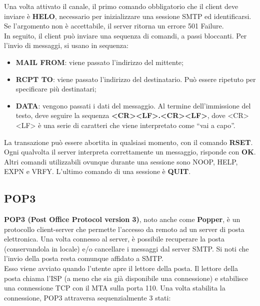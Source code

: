         Una volta attivato il canale, il primo comando obbligatorio che il client deve inviare è \textbf{HELO},
        necessario per inizializzare una sessione SMTP ed identificarsi. Se l’argomento non è
        accettabile, il server ritorna un errore 501 Failure.\\
        
        In seguito, il client può inviare una sequenza di comandi, a passi bloccanti. Per l’invio di
        messaggi, si usano in sequenza:

        \begin{itemize}
            \item \textbf{MAIL FROM}: viene passato l’indirizzo del mittente;
            \item \textbf{RCPT TO}: viene passato l’indirizzo del destinatario. Può essere ripetuto per specificare
            più destinatari;
            \item \textbf{DATA}: vengono passati i dati del messaggio. Al termine dell’immissione del testo, deve
            seguire la sequenza \textbf{<CR><LF>.<CR><LF>}, dove <CR><LF> è una serie di caratteri che
            viene interpretato come “vai a capo”.
        \end{itemize}
        
        La transazione può essere abortita in qualsiasi momento, con il comando \textbf{RSET}. Ogni qualvolta
        il server interpreta correttamente un messaggio, risponde con \textbf{OK}. Altri comandi utilizzabili
        ovunque durante una sessione sono NOOP, HELP, EXPN e VRFY. L’ultimo comando di una
        sessione è \textbf{QUIT}.
        
    \subsection{POP3}
        \textbf{POP3 (Post Office Protocol version 3)}, noto anche come \textbf{Popper}, è un protocollo client-server
        che permette l’accesso da remoto ad un server di posta elettronica. Una volta connesso al
        server, è possibile recuperare la posta (conservandola in locale) e/o cancellare i messaggi dal
        server SMTP. Si noti che l’invio della posta resta comunque affidato a SMTP.\\

        Esso viene avviato quando l’utente apre il lettore della posta. Il lettore della posta chiama l’ISP
        (a meno che sia già disponibile una connessione) e stabilisce una connessione TCP con il MTA
        sulla porta 110. Una volta stabilita la connessione, POP3 attraversa sequenzialmente 3 stati:\\

